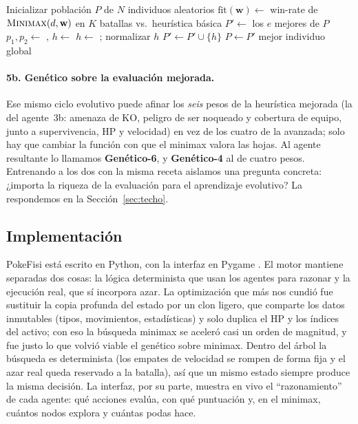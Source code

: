 \documentclass[11pt]{article}
\begin{document}
\begin{algorithm}[t]
\caption{Algoritmo genético sobre minimax}
\label{alg:ga}
\small
\begin{algorithmic}[1]
\State Inicializar población $P$ de $N$ individuos aleatorios
    \State $\text{fit}(\mathbf{w})\gets$ win-rate de $\textsc{Minimax}(d,\mathbf{w})$
    \Statex \hspace{2.2em} en $K$ batallas vs.\ heurística básica
  \EndFor
  \State $P'\gets$ los $e$ mejores de $P$ 
    \State $p_1,p_2\gets$ , 
    \State $h\gets$ 
    \State $h\gets$ ; normalizar $h$
    \State $P'\gets P'\cup\{h\}$
  \EndWhile
  \State $P\gets P'$
\EndFor
\State \Return mejor individuo global
\end{algorithmic}
\end{algorithm}

\paragraph{5b. Genético sobre la evaluación mejorada.} Ese mismo ciclo evolutivo
puede afinar los \emph{seis} pesos de la heurística mejorada (la del agente~3b:
amenaza de KO, peligro de ser noqueado y cobertura de equipo, junto a
supervivencia, HP y velocidad) en vez de los cuatro de la avanzada; solo hay que
cambiar la función con que el minimax valora las hojas. Al agente resultante lo
llamamos \textbf{Genético-6}, y \textbf{Genético-4} al de cuatro pesos. Entrenando
a los dos con la misma receta aislamos una pregunta concreta: ¿importa la riqueza
de la evaluación para el aprendizaje evolutivo? La respondemos en la
Sección~\ref{sec:techo}.

\subsection{Implementación}

PokeFisi está escrito en Python, con la interfaz en Pygame \citep{pygame}. El motor
mantiene separadas dos cosas: la lógica determinista que usan los agentes para
razonar y la ejecución real, que sí incorpora azar. La optimización que más nos
cundió fue sustituir la copia profunda del estado por un clon ligero, que comparte
los datos inmutables (tipos, movimientos, estadísticas) y solo duplica el HP y los
índices del activo; con eso la búsqueda minimax se aceleró casi un orden de
magnitud, y fue justo lo que volvió viable el genético sobre minimax. Dentro del
árbol la búsqueda es determinista (los empates de velocidad se rompen de forma
fija y el azar real queda reservado a la batalla), así que un mismo estado siempre
produce la misma decisión. La interfaz, por su parte, muestra en vivo el
``razonamiento'' de cada agente: qué acciones evalúa, con qué puntuación y, en el
minimax, cuántos nodos explora y cuántas podas hace.
\end{document}
